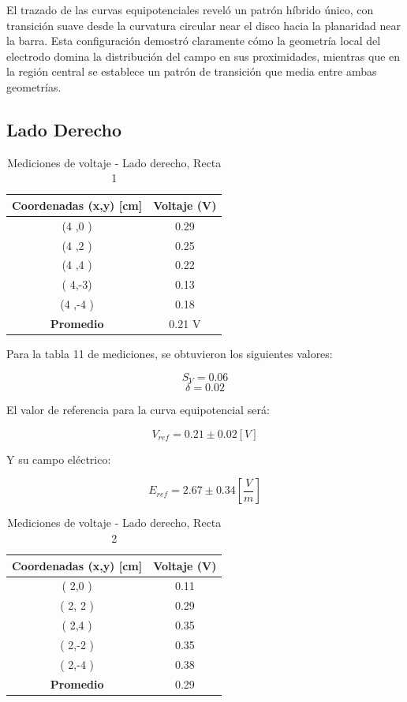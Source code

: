 \documentclass[11pt,twocolumn]{article}
\begin{document}
El trazado de las curvas equipotenciales reveló un patrón híbrido único, con transición suave desde la curvatura circular near el disco hacia la planaridad near la barra. Esta configuración demostró claramente cómo la geometría local del electrodo domina la distribución del campo en sus proximidades, mientras que en la región central se establece un patrón de transición que media entre ambas geometrías.


\subsection*{Lado Derecho}

\begin{table}[h]
\centering
\caption{Mediciones de voltaje - Lado derecho, Recta 1}
\begin{tabular}{cc}
\toprule
\textbf{Coordenadas (x,y) [cm]} & \textbf{Voltaje (V)} \\
\midrule
(4 ,0 ) & 0.29 \\
(4 ,2 ) &  0.25\\
(4 ,4 ) &  0.22\\
( 4,-3) &  0.13\\
(4 ,-4 ) & 0.18 \\
\midrule
\textbf{Promedio} &  0.21 V\\
\bottomrule
\end{tabular}
\end{table}

Para la tabla 11 de mediciones, se obtuvieron los siguientes valores:

\[S_V = 0.06 \]
\[\delta = 0.02 \]

El valor de referencia para la curva equipotencial será:

\[V_{ref} = 0.21 \pm 0.02 [V]\]

Y su campo eléctrico:

\[E_{ref} = 2.67 \pm 0.34 [\frac{V}{m}]\]

\begin{table}[h]
\centering
\caption{Mediciones de voltaje - Lado derecho, Recta 2}
\begin{tabular}{cc}
\toprule
\textbf{Coordenadas (x,y) [cm]} & \textbf{Voltaje (V)} \\
\midrule
( 2,0 ) & 0.11 \\
( 2, 2 ) & 0.29 \\
( 2,4 ) & 0.35 \\
( 2,-2 ) & 0.35 \\
( 2,-4 ) & 0.38 \\
\midrule
\textbf{Promedio} &  0.29\\
\bottomrule
\end{tabular}
\end{table}
\end{document}
